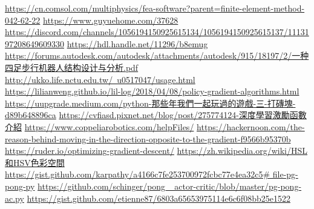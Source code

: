 \newpage
\renewcommand\bibname{參~考~文~獻}
\begin{thebibliography}{99}  %
\href{https://cn.comsol.com/multiphysics/fea-software?parent=finite-element-method-042-62-22}{https://cn.comsol.com/multiphysics/fea-software?parent=finite-element-method-042-62-22}
\href{https://www.guyuehome.com/37628}{https://www.guyuehome.com/37628}
\href{https://discord.com/channels/1056194150925615134/1056194150925615137/1113197208649609330}{https://discord.com/channels/1056194150925615134/1056194150925615137/1113197208649609330}
\href{https://hdl.handle.net/11296/b8emug}{https://hdl.handle.net/11296/b8emug}
\href{https://forums.autodesk.com/autodesk/attachments/autodesk/915/18197/2/一种四足步行机器人结构设计与分析.pdf}{https://forums.autodesk.com/autodesk/attachments/autodesk/915/18197/2/一种四足步行机器人结构设计与分析.pdf}
\href{http://ukko.life.nctu.edu.tw/~u0517047/usage.html}{http://ukko.life.nctu.edu.tw/~u0517047/usage.html}
\href{https://lilianweng.github.io/lil-log/2018/04/08/policy-gradient-algorithms.html}{https://lilianweng.github.io/lil-log/2018/04/08/policy-gradient-algorithms.html}\label{R.Policy Gradient}
\href{https://uupgrade.medium.com/python-那些年我們一起玩過的遊戲-三-打磚塊-d89b648896ca}{https://uupgrade.medium.com/python-那些年我們一起玩過的遊戲-三-打磚塊-d89b648896ca}
\href{https://cvfiasd.pixnet.net/blog/post/275774124-深度學習激勵函數介紹}{https://cvfiasd.pixnet.net/blog/post/275774124-深度學習激勵函數介紹}
\href{https://www.coppeliarobotics.com/helpFiles/}{https://www.coppeliarobotics.com/helpFiles/}
\href{https://hackernoon.com/the-reason-behind-moving-in-the-direction-opposite-to-the-gradient-f9566b95370b}{https://hackernoon.com/the-reason-behind-moving-in-the-direction-opposite-to-the-gradient-f9566b95370b}\label{OGD}
\href{https://ruder.io/optimizing-gradient-descent/}{https://ruder.io/optimizing-gradient-descent/}
\label{OGD2}
\href{https://reurl.cc/43XjEL}{https://zh.wikipedia.org/wiki/HSL和HSV色彩空間}
\label{RGBtoHSV}
\href{https://reurl.cc/gzMm4N}{https://gist.github.com/karpathy/a4166c7fe253700972fcbc77e4ea32c5\# file-pg-pong-py}\label{R.pong1}
\href{https://reurl.cc/95172Y}{https://github.com/schinger/pong\_ actor-critic/blob/master/pg-pong-ac.py}\label{R.pong1.1}
\href{https://gist.github.com/etienne87/6803a65653975114e6c6f08bb25e1522}{https://gist.github.com/etienne87/6803a65653975114e6c6f08bb25e1522}\label{R.pong2}
%
\end{thebibliography}
\newpage
